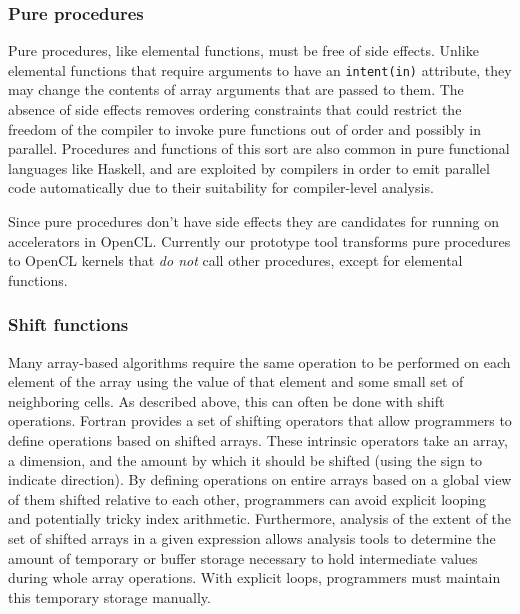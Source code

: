 \subsubsection*{Pure procedures}

Pure procedures, like elemental functions, must be free of side
effects.  Unlike elemental functions that require arguments to have an
{\tt intent(in)} attribute, they may change the contents of array
arguments that are passed to them.  The absence of side effects
removes ordering constraints that could restrict the freedom of the
compiler to invoke pure functions out of order and possibly in parallel.
Procedures and functions of this sort are also common in pure
functional languages like Haskell, and are exploited by compilers in
order to emit parallel code automatically due to their suitability for
compiler-level analysis.

Since pure procedures don't have side effects they are candidates for
running on accelerators in OpenCL.  Currently our prototype tool
transforms pure procedures to OpenCL kernels that \emph{do not} call
other procedures, except for elemental functions.

\subsubsection*{Shift functions}

Many array-based algorithms require the same operation to be performed
on each element of the array using the value of that element and some small
set of neighboring cells. As described above, this can often be done with
shift operations.
Fortran provides a set of shifting operators that allow programmers to
define operations based on shifted arrays.  These intrinsic operators take
an array, a dimension, and the amount by which it should be shifted (using
the sign to indicate direction).  By defining operations on entire arrays
based on a global view of them shifted relative to each other, programmers can
avoid explicit looping and potentially tricky index arithmetic.  Furthermore,
analysis of the extent of the set of shifted arrays in a given expression
allows analysis tools to determine the amount of temporary or buffer storage
necessary to hold intermediate values during whole array operations.  With
explicit loops, programmers must maintain this temporary storage manually.


